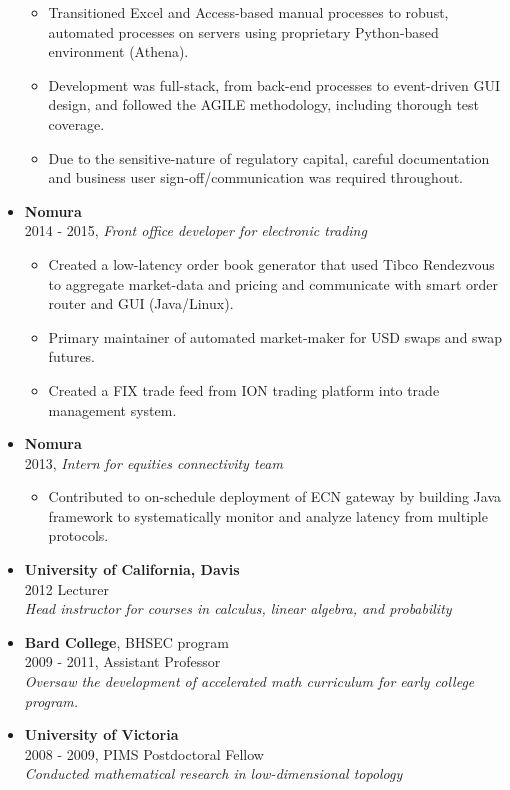 \documentclass[margin]{res}
\def\tightlist{}
\begin{document}
\begin{resume}
\begin{itemize}
  \begin{itemize}
  \tightlist
  \item
    Transitioned Excel and Access-based manual processes to robust,
    automated processes on servers using proprietary Python-based
    environment (Athena).
  \item
    Development was full-stack, from back-end processes to event-driven
    GUI design, and followed the AGILE methodology, including thorough
    test coverage.
  \item
    Due to the sensitive-nature of regulatory capital, careful
    documentation and business user sign-off/communication was required
    throughout.
  \end{itemize}
\item
  \textbf{Nomura}\\
  2014 - 2015, \emph{Front office developer for electronic trading}

  \begin{itemize}
  \tightlist
  \item
    Created a low-latency order book generator that used Tibco
    Rendezvous to aggregate market-data and pricing and communicate with
    smart order router and GUI (Java/Linux).
  \item
    Primary maintainer of automated market-maker for USD swaps and swap
    futures.
  \item
    Created a FIX trade feed from ION trading platform into trade
    management system.
  \end{itemize}
\item
  \textbf{Nomura}\\
  2013, \emph{Intern for equities connectivity team}

  \begin{itemize}
  \tightlist
  \item
    Contributed to on-schedule deployment of ECN gateway by building
    Java framework to systematically monitor and analyze latency from
    multiple protocols.
  \end{itemize}
\item
  \textbf{University of California, Davis}\\
  2012 Lecturer\\
  \emph{Head instructor for courses in calculus, linear algebra, and
  probability}
\item
  \textbf{Bard College}, BHSEC program\\
  2009 - 2011, Assistant Professor\\
  \emph{Oversaw the development of accelerated math curriculum for early
  college program.}
\item
  \textbf{University of Victoria}\\
  2008 - 2009, PIMS Postdoctoral Fellow\\
  \emph{Conducted mathematical research in low-dimensional topology}
\end{itemize}


\end{resume}
\end{document}
